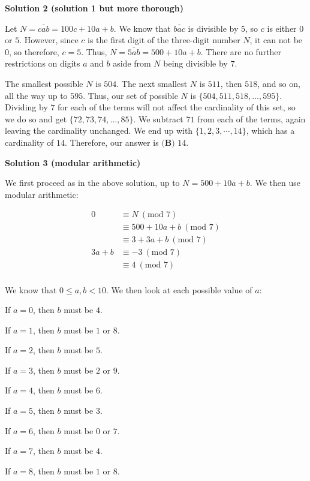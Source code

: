 \begin{enumerate}
\textbf{Solution 2 (solution 1 but more thorough)}

Let $N=\overline{cab}=100c+10a+b.$ We know that $\overline{bac}$ is divisible by $5$, so $c$ is either $0$ or $5$. However, since $c$ is the first digit of the three-digit number $N$, it can not be $0$, so therefore, $c=5$. Thus, $N=\overline{5ab}=500+10a+b.$ There are no further restrictions on digits $a$ and $b$ aside from $N$ being divisible by $7$. 

 The smallest possible $N$ is $504$. The next smallest $N$ is $511$, then $518$, and so on, all the way up to $595$. Thus, our set of possible $N$ is $\{504,511,518,\dots,595\}$. Dividing by $7$ for each of the terms will not affect the cardinality of this set, so we do so and get $\{72,73,74,\dots,85\}$. We subtract $71$ from each of the terms, again leaving the cardinality unchanged. We end up with $\{1,2,3,\cdots,14\}$, which has a cardinality of $14$. Therefore, our answer is $\boxed{\textbf{(B) } 14.}$




\textbf{Solution 3 (modular arithmetic)}

We first proceed as in the above solution, up to $N=500+10a+b$. We then use modular arithmetic: 

 
 \begin{align*} 0&\equiv N \:(\text{mod }7)\\ &\equiv500+10a+b\:(\text{mod }7)\\ &\equiv3+3a+b\:(\text{mod }7)\\ 3a+b&\equiv-3\:(\text{mod }7)\\ &\equiv4\:(\text{mod }7)\\ \end{align*}


 We know that $0\le a,b<10$. We then look at each possible value of $a$: 

 If $a=0$, then $b$ must be $4$. 

 If $a=1$, then $b$ must be $1$ or $8$. 

 If $a=2$, then $b$ must be $5$. 

 If $a=3$, then $b$ must be $2$ or $9$. 

 If $a=4$, then $b$ must be $6$. 

 If $a=5$, then $b$ must be $3$. 

 If $a=6$, then $b$ must be $0$ or $7$. 

 If $a=7$, then $b$ must be $4$. 

 If $a=8$, then $b$ must be $1$ or $8$. 


\end{enumerate}
